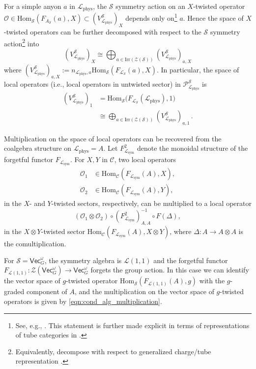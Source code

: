 \documentclass[aps,twocolumn,prx,floatfix,preprintnumbers, nofootinbib,10pt]{revtex4-2}
\numberwithin{equation}{section}
\theoremstyle{definition}
\newcommand{\cC}{\mathcal{C}}
\newcommand{\cL}{\mathcal{L}}
\newcommand{\cO}{\mathcal{O}}
\newcommand{\cP}{\mathcal{P}}
\newcommand{\cS}{\mathcal{S}}
\newcommand{\cZ}{\mathcal{Z}}
\newcommand{\Hom}{\text{Hom}}
\renewcommand{\Vec}{\mathsf{Vec}}
\newcommand{\sym}{\text{sym}}
\newcommand{\phys}{\text{phys}}
\newcommand{\Irr}{\text{Irr}}
\begin{document}
For a simple anyon $a$ in $\cL_\phys$, the $\cS$ symmetry action on an $X$-twisted operator $\cO\in \Hom_{\cS}(F_{A_\cS}(a),X)\subset (V^{\cS}_{\cL_\phys})_{X}$ depends only on\footnote{See, e.g., \cite{Bhardwaj:2023idu, Bhardwaj:2023ayw}. This statement is further made explicit in terms of representations of tube categories in \cite{Bartsch:2026wqq}.} $a$. 
Hence the space of $X$-twisted operators can be further decomposed with respect to the $\cS$ symmetry action\footnote{Equivalently, decompose with respect to generalized charge/tube representation \cite{Bartsch:2022mpm, Bartsch:2023wvv}.} into
\begin{equation}
    (V^{\cS}_{\cL_\phys})_{X} \cong \bigoplus_{a\in \Irr(\cZ(\cS))} (V^{\cS}_{\cL_\phys})_{a, X}
\end{equation}
where $(V^{\cS}_{\cL_\phys})_{a, X}:=n_{\cL_\phys,a}\Hom_{\cS}(F_{\cL_{\cS}}(a),X)$.
In particular, the space of local operators (i.e., local operators in untwisted sector) in $\cP_{\cL_\phys}^{\cS}$ is
\begin{equation}
    \begin{split}
        (V^{\cS}_{\cL_\phys})_{1} & =\Hom_{\cS}\bigl(F_{\cL_\cS}(\cL_\phys), 1\bigr)\\
        & \cong \bigoplus_{a\in \Irr(\cZ(\cS))}(V^\cS_{\cL_\phys})_{a,1}\,.
    \end{split}
\end{equation}

Multiplication on the space of local operators can be recovered from the coalgebra structure on $\cL_\phys=A$. Let %
$F^2_{\cL_\sym}$ denote the monoidal structure of the forgetful functor $F_{\cL_\sym}$. For $X,Y$ in $\cC$, two local operators
\begin{align}
    \cO_{1} & \in \Hom_{\cC}(F_{\cL_{\sym}}(A), X),\\
    \cO_{2} & \in \Hom_{\cC}(F_{\cL_{\sym}}(A), Y),
\end{align}
in the $X$- and $Y$-twisted sectors, respectively, 
can be multiplied to a local operator
\begin{equation}
    (\cO_{1}\otimes\cO_{2}) \circ (F^2_{\cL_\sym})_{A, A}^{-1}\circ F(\Delta),
\end{equation}
in the $X\otimes Y$-twisted sector $\Hom_{\cC}(F_{\cL_{\sym}}(A), X\otimes Y)$, where $\Delta:A\rightarrow A\otimes A$ is the comultiplication.

For $\cS=\Vec_G^\omega$, the symmetry algebra is $\cL(1,1)$ and the forgetful functor $F_{\cL(1,1)}:\cZ(\Vec_G^\omega)\rightarrow \Vec_G^\omega$ forgets the group action. In this case we can identify the vector space of $g$-twisted operator $\Hom_{\cS}(F_{\cL(1,1)}(A),g)$ with the $g$-graded component of $A$, and the multiplication on the vector space of $g$-twisted operators is given by \eqref{eqn:cond_alg_multiplication}.
\end{document}
